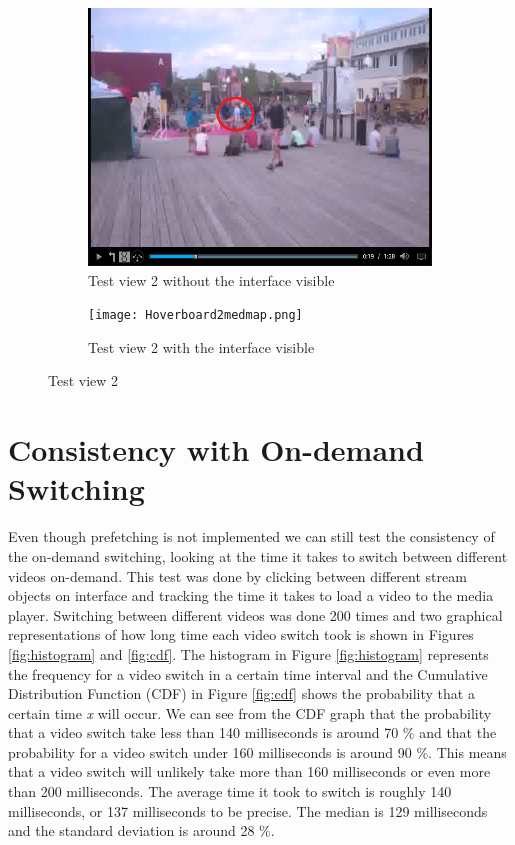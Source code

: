 \begin{figure}
\begin{subfigure}[b]{0.5\textwidth}
 	\includegraphics[width=\linewidth]{Hoverboard_2.png}
  	\caption{Test view 2 without the interface visible}\label{fig:testview2A}
    \end{subfigure}\hfill 
    \hspace{3px}
    \begin{subfigure}[b]{0.5\textwidth}
	 \texttt{[image: Hoverboard2medmap.png]}
 	\caption{Test view 2 with the interface visible}\label{fig:testview2B}
    \end{subfigure}
	\caption{Test view 2}
	\label{fig:testview2}
\end{figure}

\section{Consistency with On-demand Switching}
Even though prefetching is not implemented we can still test the consistency of the on-demand switching, looking at the time it takes to switch between different videos on-demand. This test was done by clicking between different stream objects on interface and tracking the time it takes to load a video to the media player. Switching between different videos was done 200 times and two graphical representations of how long time each video switch took is shown in Figures \ref{fig:histogram} and \ref{fig:cdf}. The histogram in Figure \ref{fig:histogram} represents the frequency for a video switch in a certain time interval and the Cumulative Distribution Function (CDF) in Figure \ref{fig:cdf} shows the probability that a certain time \textit{x} will occur. We can see from the CDF graph that the probability that a video switch take less than 140 milliseconds is around 70 $\%$ and that the probability for a video switch under 160 milliseconds is around 90 $\%$. This means that a video switch will unlikely take more than 160 milliseconds or even more than 200 milliseconds. The average time it took to switch is roughly 140 milliseconds, or 137 milliseconds to be precise. The median is 129 milliseconds and the standard deviation is around 28 $\%$.

